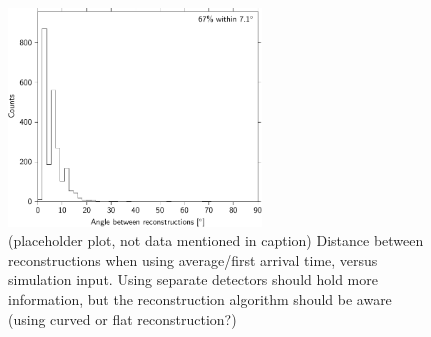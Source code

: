 \begin{figure}
    \centering
    \includegraphics[width=0.6\textwidth]
                    {plots/experiment/angle_between_501_minn16_510}
    \caption{(placeholder plot, not data mentioned in caption) Distance between reconstructions when using average/first arrival time, versus simulation input. Using separate detectors should hold more information, but the reconstruction algorithm should be aware (using curved or flat reconstruction?)}
    \label{fig:angle_between_501_minn16_510}
\end{figure}
